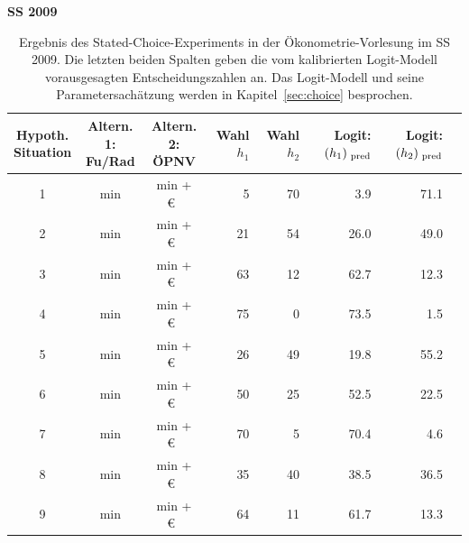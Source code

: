 \begin{table}
\begin{center}
\textbf{SS 2009}
\begin{tabular}{|c||c|c||r|r|r|r|r|}
\hline
\myBox{5em}{Hypoth.\\Situation} & 
\myBox{5em}{Altern. 1:\\Fu\3/Rad}  & 
\myBox{6em}{Altern. 2:\\ \"OPNV} & 
\myBox{2em}{Wahl\\$h_1$} & 
\myBox{2em}{Wahl\\$h_2$} &
\myBox{3em}{Logit:\\$(h_1)_{{\mbox{ {\scriptsize \hspace{-0.2ex}pred}}}}$} &
\myBox{3em}{Logit:\\$(h_2)_{{\mbox{ {\scriptsize \hspace{-0.2ex}pred}}}}$}\\ \hline\hline
1 & \unit[30]{min} & \unit[30]{min} + \unit[0]{\euro{}} & 5 & 70 & 3.9& 71.1\\ \hline
2 & \unit[30]{min} & \unit[40]{min} + \unit[0]{\euro{}} & 21 & 54 & 26.0& 49.0\\ \hline
3 & \unit[30]{min} & \unit[50]{min} + \unit[0]{\euro{}} & 63 & 12 & 62.7& 12.3\\ \hline
4 & \unit[30]{min} & \unit[60]{min} + \unit[0]{\euro{}} & 75 & 0 & 73.5& 1.5\\ \hline
5 & \unit[30]{min} & \unit[30]{min} + \unit[1]{\euro{}} & 26 & 49 & 19.8& 55.2\\ \hline
6 & \unit[30]{min} & \unit[30]{min} + \unit[2]{\euro{}} & 50 & 25 & 52.5& 22.5\\ \hline
7 & \unit[30]{min} & \unit[30]{min} + \unit[3]{\euro{}} & 70 & 5 & 70.4& 4.6\\ \hline
8 & \unit[20]{min} & \unit[30]{min} + \unit[0]{\euro{}} & 35 & 40 & 38.5& 36.5 \\ \hline
9 & \unit[15]{min} & \unit[30]{min} + \unit[0]{\euro{}} & 64 & 11 & 61.7& 13.3\\ \hline
\end{tabular}

\end{center}
\caption{\label{tab:statedChoice}Ergebnis des
Stated-Choice-Experiments in der
 \"Okonometrie-Vorlesung im SS 2009. Die letzten beiden Spalten geben die vom
kalibrierten Logit-Modell vorausgesagten Entscheidungszahlen an. Das
Logit-Modell und seine Parametersach\"atzung werden in
Kapitel~\ref{sec:choice} besprochen.
}
\end{table}

